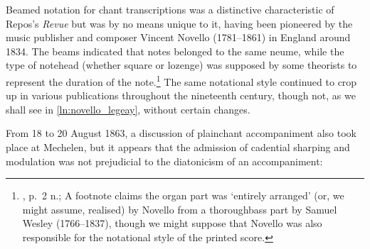 %
Beamed notation for chant transcriptions was a distinctive characteristic of Repos's \emph{Revue} but was by no means unique to it, having been pioneered by the music publisher and composer Vincent Novello (1781--1861) in England around 1834.
The beams indicated that notes belonged to the same neume, while the type of notehead (whether square or lozenge) was supposed by some theorists to represent the duration of the note.\footnote{\cite{WesleyConventMasstextnumero11834}, p.~2 n.\kern -1pt; A footnote claims the organ part was `entirely arranged' (or, we might assume, realised) by Novello from a thoroughbass part by Samuel Wesley (1766--1837), though we might suppose that Novello was also responsible for the notational style of the printed score.}
The same notational style continued to crop up in various publications throughout the nineteenth century, though not, as we shall see in \cref{ln:novello_legeay}, without certain changes.
%

From 18 to 20 August 1863, a discussion of plainchant accompaniment also took place at Mechelen, but it appears that the admission of cadential sharping and modulation was not prejudicial to the diatonicism of an accompaniment:

